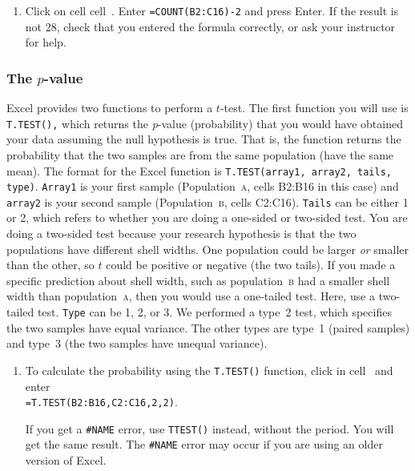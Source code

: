 \documentclass[12pt]{exam}
\newcommand*\Popa{Population~\textsc{a}}
\newcommand*\Popb{Population~\textsc{b}}
\newcommand*\popa{population~\textsc{a}} %
\newcommand*\popb{population~\textsc{b}} %
\newcommand*\xcell[1]{cell~\liningnum{#1}}
\begin{document}
\begin{enumerate}[resume]

	\item \label{df_calc} Click on cell \xcell{B18}. Enter \texttt{=COUNT(B2:C16)-2} and press Enter. If the result is not 28, check that you entered the formula correctly, or ask your instructor for help.
	
\end{enumerate}

\subsubsection*{The $p$-value}

Excel provides two functions to perform a $t$-test. The first function you will use is \texttt{T.TEST(),} which returns the \emph{p}-value (probability) that you would have obtained your data assuming the null hypothesis is true. That is, the function returns the probability that the two samples are from the same population (have the same mean).  The format for the Excel function is \texttt{T.TEST(array1, array2, tails, type)}. \texttt{Array1} is your first sample (\Popa, cells {\liningnum B2:B16} in this case) and \texttt{array2} is your second sample (\Popb, cells {\liningnum C2:C16}). \texttt{Tails} can be either 1 or 2, which refers to whether you are doing a one-sided or two-sided test. You are doing a two-sided test because your research hypothesis is that the two populations have different shell widths. One population could be larger \emph{or} smaller than the other, so $t$ could be positive or negative (the two tails). If you made a specific prediction about shell width, such as \popb{} had a smaller shell width than \popa, then you would use a one-tailed test. Here, use a two-tailed test.  \texttt{Type} can be 1, 2, or 3. We performed a type~2 test, which specifies the two samples have equal variance. The other types are type~1 (paired samples) and type~3 (the two samples have unequal variance).

\begin{enumerate}[resume]
	\item To calculate the probability using the \texttt{T.TEST()} function, click in \xcell{B19} and enter\\ \texttt{=T.TEST(B2:B16,C2:C16,2,2)}. 
	
	If you get a \texttt{\#NAME} error, use \texttt{TTEST()} instead, without the period. You will get the same result. The \texttt{\#NAME} error may occur if you are using an older version of Excel. 

\end{enumerate}
\end{document}
